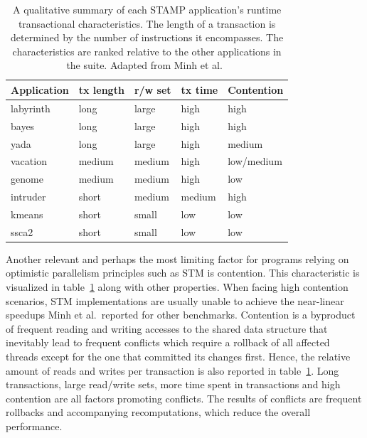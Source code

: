 \begin{table}
    \centering
    \begin{tabular}{|l|l|l|l|l|}
        \hline
        \textbf{Application} & \textbf{tx length} & \textbf{r/w set} & \textbf{tx time} & \textbf{Contention}\\\hline\hline
        labyrinth & long & large & high & high\\\hline
        bayes & long & large & high & high\\\hline
        yada & long & large & high & medium\\\hline
        vacation & medium & medium & high & low/medium\\\hline
        genome & medium & medium & high & low\\\hline
        intruder & short & medium & medium & high\\\hline
        kmeans & short & small & low & low\\\hline
        ssca2 & short & small & low & low\\\hline
    \end{tabular}
    \caption{A qualitative summary of each STAMP application's runtime transactional characteristics. The length of a transaction is determined by the number of instructions it encompasses. The characteristics are ranked relative to the other applications in the suite. Adapted from Minh et al.~\cite{minh2008stamp}}
    \label{tab:experiments:categorization}
\end{table}

Another relevant and perhaps the most limiting factor for programs relying on optimistic parallelism principles such as STM is contention.
This characteristic is visualized in table~\ref{tab:experiments:categorization} along with other properties.
When facing high contention scenarios, STM implementations are usually unable to achieve the near-linear speedups Minh et al.\ reported for other benchmarks.
Contention is a byproduct of frequent reading and writing accesses to the shared data structure that inevitably lead to frequent conflicts which require a rollback of all affected threads except for the one that committed its changes first.
Hence, the relative amount of reads and writes per transaction is also reported in table~\ref{tab:experiments:categorization}.
Long transactions, large read/write sets, more time spent in transactions and high contention are all factors promoting conflicts.
The results of conflicts are frequent rollbacks and accompanying recomputations, which reduce the overall performance.

